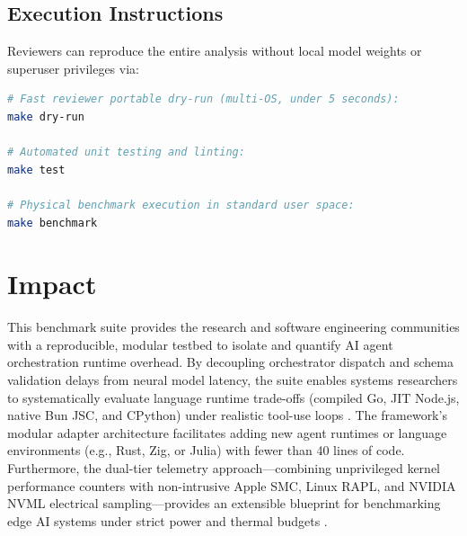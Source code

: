 \documentclass[preprint,12pt,3p]{elsarticle}
\begin{document}
\subsection{Execution Instructions}
Reviewers can reproduce the entire analysis without local model weights or superuser privileges via:
\begin{lstlisting}[language=bash]
# Fast reviewer portable dry-run (multi-OS, under 5 seconds):
make dry-run

# Automated unit testing and linting:
make test

# Physical benchmark execution in standard user space:
make benchmark
\end{lstlisting}

\section{Impact}
\label{sec:impact}
This benchmark suite provides the research and software engineering communities with a reproducible, modular testbed to isolate and quantify AI agent orchestration runtime overhead. By decoupling orchestrator dispatch and schema validation delays from neural model latency, the suite enables systems researchers to systematically evaluate language runtime trade-offs (compiled Go, JIT Node.js, native Bun JSC, and CPython) under realistic tool-use loops \cite{yao2023react, kwon2023vllm}. The framework's modular adapter architecture facilitates adding new agent runtimes or language environments (e.g., Rust, Zig, or Julia) with fewer than 40 lines of code. Furthermore, the dual-tier telemetry approach---combining unprivileged kernel performance counters with non-intrusive Apple SMC, Linux RAPL, and NVIDIA NVML electrical sampling---provides an extensible blueprint for benchmarking edge AI systems under strict power and thermal budgets \cite{barroso2007case, you2023zeus, fahad2019comparative}.
\end{document}
